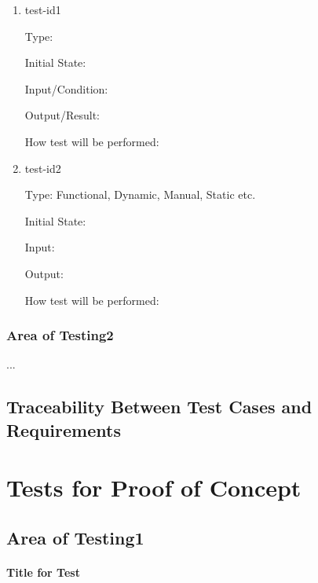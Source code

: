 \documentclass[12pt, titlepage]{article}
\begin{document}
\begin{enumerate}

\item{test-id1\\}

Type: 
                    
Initial State: 
                    
Input/Condition: 
                    
Output/Result: 
                    
How test will be performed: 
                    
\item{test-id2\\}

Type: Functional, Dynamic, Manual, Static etc.
                    
Initial State: 
                    
Input: 
                    
Output: 
                    
How test will be performed: 

\end{enumerate}

\subsubsection{Area of Testing2}

...

\subsection{Traceability Between Test Cases and Requirements}

\section{Tests for Proof of Concept}

\subsection{Area of Testing1}
        
\paragraph{Title for Test}
\end{document}
